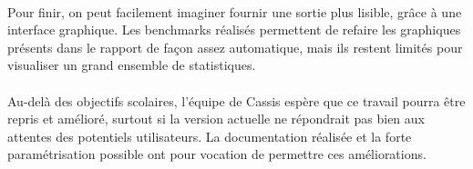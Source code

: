 \paragraph{}
Pour finir, on peut facilement imaginer fournir une sortie plus lisible, grâce à une interface graphique. Les benchmarks réalisés permettent de refaire les graphiques présents dans le rapport de façon assez automatique, mais ils restent limités pour visualiser un grand ensemble de statistiques.

\paragraph{}
Au-delà des objectifs scolaires, l'équipe de \textsf{Cassis} espère que ce travail pourra être repris et amélioré, surtout si la version actuelle ne répondrait pas bien aux attentes des potentiels utilisateurs. La documentation réalisée et la forte paramétrisation possible ont pour vocation de permettre ces améliorations.
